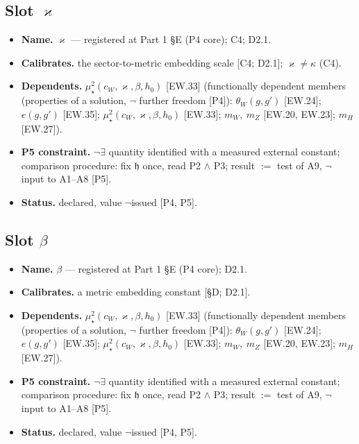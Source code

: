 \documentclass[11pt,openany]{report}
\theoremstyle{canonplain}
\theoremstyle{canondef}
\begin{document}
\subsection*{Slot $\varkappa$}
\begin{itemize}\setlength{\itemsep}{2pt}
\item \textbf{Name.} $\varkappa$ — registered at Part 1 §E (P4 core); C4; D2.1.
\item \textbf{Calibrates.} the sector-to-metric embedding scale [C4; D2.1]; $\varkappa\ne\kappa$ (C4).
\item \textbf{Dependents.} $\mu_\star^2(c_W,\varkappa,\beta,h_0)$ [EW.33] (functionally dependent members (properties of a solution, $\neg$ further freedom [P4]): $\theta_W(g,g')$ [EW.24]; $e(g,g')$ [EW.35]; $\mu_\star^2(c_W,\varkappa,\beta,h_0)$ [EW.33]; $m_W,\ m_Z$ [EW.20, EW.23]; $m_H$ [EW.27]).
\item \textbf{P5 constraint.} $\neg\exists$ quantity identified with a measured external constant; comparison procedure: fix $\mathfrak h$ once, read P2 $\wedge$ P3; result $:=$ test of A9, $\neg$ input to A1--A8 [P5].
\item \textbf{Status.} declared, value $\neg$issued [P4, P5].
\end{itemize}
\subsection*{Slot $\beta$}
\begin{itemize}\setlength{\itemsep}{2pt}
\item \textbf{Name.} $\beta$ — registered at Part 1 §E (P4 core); D2.1.
\item \textbf{Calibrates.} a metric embedding constant [§D; D2.1].
\item \textbf{Dependents.} $\mu_\star^2(c_W,\varkappa,\beta,h_0)$ [EW.33] (functionally dependent members (properties of a solution, $\neg$ further freedom [P4]): $\theta_W(g,g')$ [EW.24]; $e(g,g')$ [EW.35]; $\mu_\star^2(c_W,\varkappa,\beta,h_0)$ [EW.33]; $m_W,\ m_Z$ [EW.20, EW.23]; $m_H$ [EW.27]).
\item \textbf{P5 constraint.} $\neg\exists$ quantity identified with a measured external constant; comparison procedure: fix $\mathfrak h$ once, read P2 $\wedge$ P3; result $:=$ test of A9, $\neg$ input to A1--A8 [P5].
\item \textbf{Status.} declared, value $\neg$issued [P4, P5].
\end{itemize}
\end{document}
